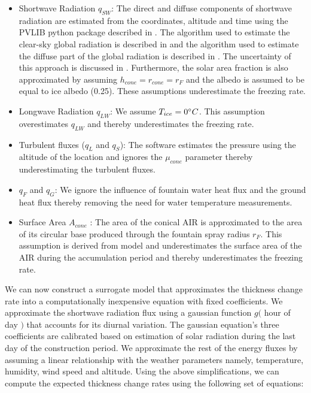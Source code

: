 \documentclass[utf8]{frontiersSCNS}
\begin{document}
\begin{itemize}

  \item Shortwave Radiation $q_{SW}$: The direct and diffuse components of shortwave radiation are estimated from the coordinates,
    altitude and time using the PVLIB python package described in \cite{holmgrenPvlibPythonPython2018} . The
    algorithm used to estimate the clear-sky global radiation is described in
    \cite{ineichenBroadbandSimplifiedVersion2008} and the algorithm used to estimate the diffuse part of the
    global radiation is described in \cite{erbsEstimationDiffuseRadiation1982}. The uncertainty of this approach
    is discussed in \cite{ineichenValidationModelsThat2016}. Furthermore, the solar area fraction is also
    approximated by assuming $h_{cone} = r_{cone} = r_{F}$ and the albedo is assumed to be equal to ice albedo
    (0.25). These assumptions underestimate the freezing rate.

  \item Longwave Radiation $q_{LW}$: We assume $T_{ice} = 0 \degree C$. This assumption overestimates $q_{LW}$
    and thereby underestimates the freezing rate.

  \item Turbulent fluxes ($q_{L}$ and $q_{S}$): The software estimates the pressure using the altitude of the
    location and ignores the $\mu_{cone}$ parameter thereby underestimating the turbulent fluxes.

  \item $q_{F}$ and $q_{G}$: We ignore the influence of fountain water heat flux and the ground heat flux
    thereby removing the need for water temperature measurements.

  \item Surface Area $A_{cone}$ : The area of the conical AIR is approximated to the area of its circular base
    produced through the fountain spray radius $r_F$. This assumption is derived from
    \cite{oerlemansBriefCommunicationGrowth2021} model and underestimates the surface area of the AIR during the
    accumulation period and thereby underestimates the freezing rate.

\end{itemize}


We can now construct a surrogate model that approximates the thickness change rate into a computationally
inexpensive equation with fixed coefficients. We approximate the shortwave radiation flux using a gaussian
function $g($ hour of day $)$ that accounts for its diurnal variation. The gaussian equation's three
coefficients are calibrated based on estimation of solar radiation during the last day of the construction
period. We approximate the rest of the energy fluxes by assuming a linear relationship with the weather
parameters namely, temperature, humidity, wind speed and altitude. Using the above simplifications, we can
compute the expected thickness change rates using the following set of equations:
\end{document}
